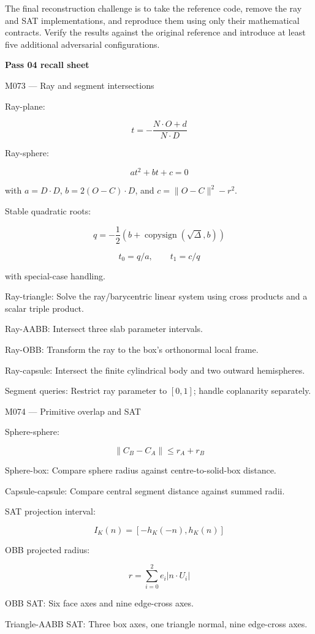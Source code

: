 The final reconstruction challenge is to take the reference code, remove the ray and SAT implementations, and reproduce them using only their mathematical contracts. Verify the results against the original reference and introduce at least five additional adversarial configurations.

\textbf{Pass 04 recall sheet}

M073 --- Ray and segment intersections

Ray-plane:

\[
\boxed{t=-\frac{N\cdot O+d}{N\cdot D}}
\]

Ray-sphere:

\[
at^2+bt+c=0
\]

with \(a=D\cdot D\), \(b=2(O-C)\cdot D\), and \(c=\|O-C\|^2-r^2\).

Stable quadratic roots:

\[
q=-\frac12(b+\operatorname{copysign}(\sqrt\Delta,b))
\]

\[
t_0=q/a,\qquad t_1=c/q
\]

with special-case handling.

Ray-triangle: Solve the ray/barycentric linear system using cross products and a scalar triple product.

Ray-AABB: Intersect three slab parameter intervals.

Ray-OBB: Transform the ray to the box's orthonormal local frame.

Ray-capsule: Intersect the finite cylindrical body and two outward hemispheres.

Segment queries: Restrict ray parameter to \([0,1]\); handle coplanarity separately.

M074 --- Primitive overlap and SAT

Sphere-sphere:

\[
\boxed{\|C_B-C_A\|\le r_A+r_B}
\]

Sphere-box: Compare sphere radius against centre-to-solid-box distance.

Capsule-capsule: Compare central segment distance against summed radii.

SAT projection interval:

\[
\boxed{ I_K(n)=[-h_K(-n),h_K(n)] }
\]

OBB projected radius:

\[
\boxed{ r=\sum_{i=0}^{2}e_i|n\cdot U_i| }
\]

OBB SAT: Six face axes and nine edge-cross axes.

Triangle-AABB SAT: Three box axes, one triangle normal, nine edge-cross axes.

